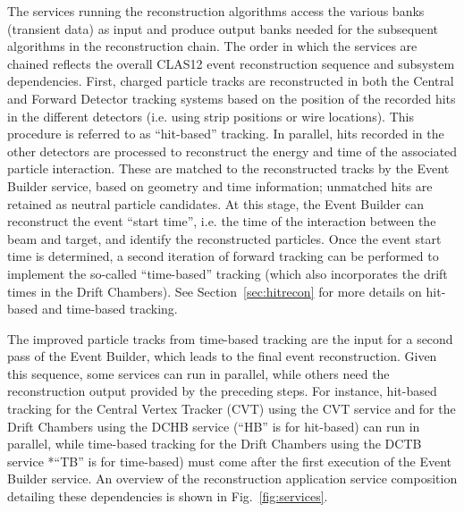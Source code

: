 The services running the reconstruction algorithms access the various banks (transient data) as input and produce
output banks needed for the subsequent algorithms in the reconstruction chain. The order in which the services are
chained reflects the overall CLAS12 event reconstruction sequence and subsystem dependencies. First, charged
particle tracks are reconstructed in both the Central and Forward Detector tracking systems based on the position
of the recorded hits in the different detectors (i.e. using strip positions or wire locations). This procedure is
referred to as ``hit-based'' tracking. In parallel, hits recorded in the other detectors are processed to reconstruct
the energy and time of the associated particle interaction. These are matched to the reconstructed tracks by the
Event Builder service, based on geometry and time information; unmatched hits are retained as neutral particle
candidates. At this stage, the Event Builder can reconstruct the event ``start time'', i.e. the time of the interaction
between the beam and target, and identify the reconstructed particles. Once the event start time is determined, a
second iteration of forward tracking can be performed to implement the so-called ``time-based'' tracking (which
also incorporates the drift times in the Drift Chambers). See Section~\ref{sec:hitrecon} for more details on
hit-based and time-based tracking.

The improved particle tracks from time-based tracking are the input for a second pass of the Event Builder, which
leads to the final event reconstruction. Given this sequence, some services can run in parallel, while others need the
reconstruction output provided by the preceding steps. For instance, hit-based tracking for the Central Vertex
Tracker (CVT) using the CVT service and for the Drift Chambers using the DCHB service (``HB'' is for hit-based)
can run in parallel, while time-based tracking for the Drift Chambers using the DCTB service *``TB'' is for time-based)
must come after the first execution of the Event Builder service. An overview of the reconstruction application service
composition detailing these dependencies is shown in Fig.~\ref{fig:services}.
